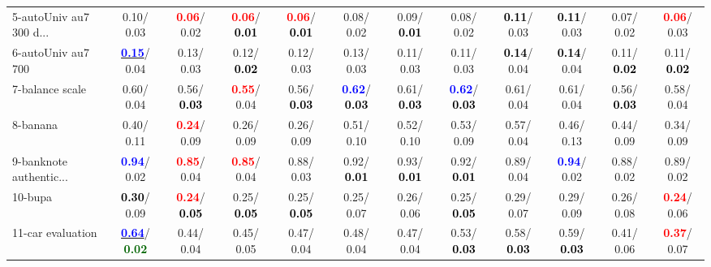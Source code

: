 \begin{table}[h]
\begin{center}
{\begin{tabular}{lc|c|c|c|c|c|c|c|c|c|c}
5-autoUniv au7 300 d... &   0.10/  0.03 & \textcolor{red}{\textbf{  0.06}}/  0.02 & \textcolor{red}{\textbf{  0.06}}/\textcolor{black}{\textbf{  0.01}} & \textcolor{red}{\textbf{  0.06}}/\textcolor{black}{\textbf{  0.01}} &   0.08/  0.02 &   0.09/\textcolor{black}{\textbf{  0.01}} &   0.08/  0.02 & \textcolor{black}{\textbf{  0.11}}/  0.03 & \textcolor{black}{\textbf{  0.11}}/  0.03 &   0.07/  0.02 & \textcolor{red}{\textbf{  0.06}}/  0.03 \\
6-autoUniv au7 700 & \underline{\textcolor{blue}{\textbf{  0.15}}}/  0.04 &   0.13/  0.03 &   0.12/\textcolor{black}{\textbf{  0.02}} &   0.12/  0.03 &   0.13/  0.03 &   0.11/  0.03 &   0.11/  0.03 & \textcolor{black}{\textbf{  0.14}}/  0.04 & \textcolor{black}{\textbf{  0.14}}/  0.04 &   0.11/\textcolor{black}{\textbf{  0.02}} &   0.11/\textcolor{black}{\textbf{  0.02}} \\
7-balance scale &   0.60/  0.04 &   0.56/\textcolor{black}{\textbf{  0.03}} & \textcolor{red}{\textbf{  0.55}}/  0.04 &   0.56/\textcolor{black}{\textbf{  0.03}} & \textcolor{blue}{\textbf{  0.62}}/\textcolor{black}{\textbf{  0.03}} &   0.61/\textcolor{black}{\textbf{  0.03}} & \textcolor{blue}{\textbf{  0.62}}/\textcolor{black}{\textbf{  0.03}} &   0.61/  0.04 &   0.61/  0.04 &   0.56/\textcolor{black}{\textbf{  0.03}} &   0.58/  0.04 \\ \hline
8-banana &   0.40/  0.11 & \textcolor{red}{\textbf{  0.24}}/  0.09 &   0.26/  0.09 &   0.26/  0.09 &   0.51/  0.10 &   0.52/  0.10 &   0.53/  0.09 &   0.57/  0.04 &   0.46/  0.13 &   0.44/  0.09 &   0.34/  0.09 \\
9-banknote authentic... & \textcolor{blue}{\textbf{  0.94}}/  0.02 & \textcolor{red}{\textbf{  0.85}}/  0.04 & \textcolor{red}{\textbf{  0.85}}/  0.04 &   0.88/  0.03 &   0.92/\textcolor{black}{\textbf{  0.01}} &   0.93/\textcolor{black}{\textbf{  0.01}} &   0.92/\textcolor{black}{\textbf{  0.01}} &   0.89/  0.04 & \textcolor{blue}{\textbf{  0.94}}/  0.02 &   0.88/  0.02 &   0.89/  0.02 \\
10-bupa & \textcolor{black}{\textbf{  0.30}}/  0.09 & \textcolor{red}{\textbf{  0.24}}/\textcolor{black}{\textbf{  0.05}} &   0.25/\textcolor{black}{\textbf{  0.05}} &   0.25/\textcolor{black}{\textbf{  0.05}} &   0.25/  0.07 &   0.26/  0.06 &   0.25/\textcolor{black}{\textbf{  0.05}} &   0.29/  0.07 &   0.29/  0.09 &   0.26/  0.08 & \textcolor{red}{\textbf{  0.24}}/  0.06 \\
11-car evaluation & \underline{\textcolor{blue}{\textbf{  0.64}}}/\textcolor{darkgreen}{\textbf{  0.02}} &   0.44/  0.04 &   0.45/  0.05 &   0.47/  0.04 &   0.48/  0.04 &   0.47/  0.04 &   0.53/\textcolor{black}{\textbf{  0.03}} &   0.58/\textcolor{black}{\textbf{  0.03}} &   0.59/\textcolor{black}{\textbf{  0.03}} &   0.41/  0.06 & \textcolor{red}{\textbf{  0.37}}/  0.07 \\

\end{tabular}}
\end{center}
\end{table}
